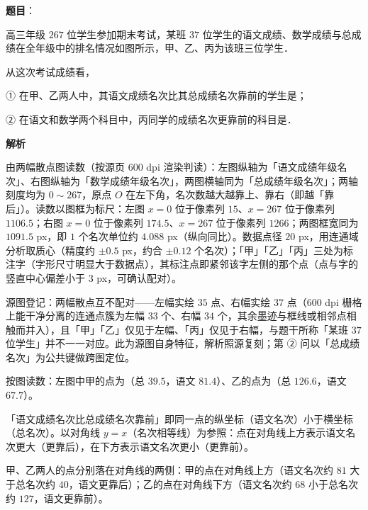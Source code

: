 \begin{answer}

\textbf{题目}：

高三年级 \(267\) 位学生参加期末考试，某班 \(37\) 位学生的语文成绩、数学成绩与总成绩在全年级中的排名情况如图所示，甲、乙、丙为该班三位学生．
\nopagebreak[4]
\begin{center}\end{center}
\nopagebreak[4]
从这次考试成绩看，

① 在甲、乙两人中，其语文成绩名次比其总成绩名次靠前的学生是\gkblank{}；

② 在语文和数学两个科目中，丙同学的成绩名次更靠前的科目是\gkblank{}．

\textbf{解析}

由两幅散点图读数（按源页 600 dpi 渲染判读）：左图纵轴为「语文成绩年级名次」、右图纵轴为「数学成绩年级名次」，两图横轴同为「总成绩年级名次」；两轴刻度均为 \(0\sim267\)，原点 \(O\) 在左下角，名次数越大越靠上、靠右（即越「靠后」）。读数以图框为标尺：左图 \(x=0\) 位于像素列 \(15\)、\(x=267\) 位于像素列 \(1106.5\)；右图 \(x=0\) 位于像素列 \(174.5\)、\(x=267\) 位于像素列 \(1266\)；两图框宽同为 \(1091.5\) px，即 \(1\) 个名次单位约 \(4.088\) px（纵向同比）。数据点径 \(20\) px，用连通域分析取质心（精度约 \(\pm0.5\) px，约合 \(\pm0.12\) 个名次）；「甲」「乙」「丙」三处为标注字（字形尺寸明显大于数据点），其标注点即紧邻该字左侧的那个点（点与字的竖直中心偏差小于 \(3\) px，可确认配对）。

源图登记：两幅散点互不配对——左幅实绘 \(35\) 点、右幅实绘 \(37\) 点（600 dpi 栅格上能干净分离的连通点簇为左幅 \(33\) 个、右幅 \(34\) 个，其余墨迹与框线或相邻点相触而并入），且「甲」「乙」仅见于左幅、「丙」仅见于右幅，与题干所称「某班 \(37\) 位学生」并不一一对应。此为源图自身特征，解析照源复刻；第 ② 问以「总成绩名次」为公共键做跨图定位。


按图读数：左图中甲的点为（总 \(39.5\)，语文 \(81.4\)）、乙的点为（总 \(126.6\)，语文 \(67.7\)）。

「语文成绩名次比总成绩名次靠前」即同一点的纵坐标（语文名次）小于横坐标（总名次）。以对角线 \(y=x\)（名次相等线）为参照：点在对角线上方表示语文名次更大（更靠后），在下方表示语文名次更小（更靠前）。

甲、乙两人的点分别落在对角线的两侧：甲的点在对角线上方（语文名次约 \(81\) 大于总名次约 \(40\)，语文更靠后）；乙的点在对角线下方（语文名次约 \(68\) 小于总名次约 \(127\)，语文更靠前）。


\end{answer}
